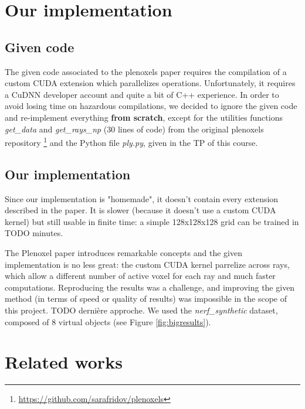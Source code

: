 \documentclass{article}
\begin{document}
\section{Our implementation}\label{sec:ourimp}

\subsection{Given code}


The given code associated to the plenoxels paper requires the compilation of a custom CUDA extension which parallelizes operations. Unfortunately, it requires a CuDNN developer account and quite a bit of C++ experience. In order to avoid losing time on hazardous compilations, we decided to ignore the given code and re-implement everything \textbf{from scratch}, except for the utilities functions \textit{get\_data} and \textit{get\_rays\_np} (30 lines of code) from the original plenoxels repository \footnote{\url{https://github.com/sarafridov/plenoxels}} and the Python file \textit{ply.py}, given in the TP of this course.  

\subsection{Our implementation}


Since our implementation is "homemade", it doesn't contain every extension described in the paper. It is slower (because it doesn't use a custom CUDA kernel) but still usable in finite time: a simple 128x128x128 grid can be trained in TODO minutes. 

The Plenoxel paper introduces remarkable concepts and the given implementation is no less great: the custom CUDA kernel parrelize across rays, which allow a different number of active voxel for each ray and much faster computations. Reproducing the results was a challenge, and improving the given method (in terms of speed or quality of results) was impossible in the scope of this project. TODO dernière approche.
We used the \textit{nerf\_synthetic} dataset, composed of 8 virtual objects (see Figure \ref{fig:bigresults}).

\section{Related works}\label{sec:relat}
\end{document}
